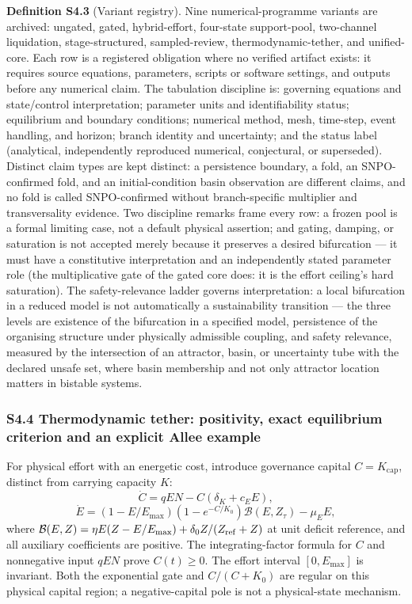 \documentclass[
  10pt,
  a4paper,
]{article}
\begin{document}
\textbf{Definition S4.3} (Variant registry). Nine numerical-programme
variants are archived: ungated, gated, hybrid-effort, four-state
support-pool, two-channel liquidation, stage-structured, sampled-review,
thermodynamic-tether, and unified-core. Each row is a registered
obligation where no verified artifact exists: it requires source
equations, parameters, scripts or software settings, and outputs before
any numerical claim. The tabulation discipline is: governing equations
and state/control interpretation; parameter units and identifiability
status; equilibrium and boundary conditions; numerical method, mesh,
time-step, event handling, and horizon; branch identity and uncertainty;
and the status label (analytical, independently reproduced numerical,
conjectural, or superseded). Distinct claim types are kept distinct: a
persistence boundary, a fold, an SNPO-confirmed fold, and an
initial-condition basin observation are different claims, and no fold is
called SNPO-confirmed without branch-specific multiplier and
transversality evidence. Two discipline remarks frame every row: a
frozen pool is a formal limiting case, not a default physical assertion;
and gating, damping, or saturation is not accepted merely because it
preserves a desired bifurcation --- it must have a constitutive
interpretation and an independently stated parameter role (the
multiplicative gate of the gated core does: it is the effort ceiling's
hard saturation). The safety-relevance ladder governs interpretation: a
local bifurcation in a reduced model is not automatically a
sustainability transition --- the three levels are existence of the
bifurcation in a specified model, persistence of the organising
structure under physically admissible coupling, and safety relevance,
measured by the intersection of an attractor, basin, or uncertainty tube
with the declared unsafe set, where basin membership and not only
attractor location matters in bistable systems.

\subsubsection{S4.4 Thermodynamic tether: positivity, exact equilibrium
criterion and an explicit Allee
example}\label{s4.4-thermodynamic-tether-positivity-exact-equilibrium-criterion-and-an-explicit-allee-example}

For physical effort with an energetic cost, introduce governance capital
\(C=K_{\mathrm{cap}}\), distinct from carrying capacity \(K\):
\[\dot C=qEN-C(\delta_K+c_EE),\]
\[\dot E=(1-E/E_{\max})(1-e^{-C/K_0})\mathcal B(E,Z_\tau)-\mu_EE,\]
where \(\mathcal B(E,Z)=\eta E(Z-E/E_{\max})+\delta_0Z/(Z_{\rm ref}+Z)\)
at unit deficit reference, and all auxiliary coefficients are positive.
The integrating-factor formula for \(C\) and nonnegative input \(qEN\)
prove \(C(t)\ge0\). The effort interval \([0,E_{\max}]\) is invariant.
Both the exponential gate and \(C/(C+K_0)\) are regular on this physical
capital region; a negative-capital pole is not a physical-state
mechanism.
\end{document}
